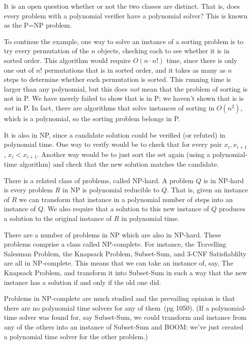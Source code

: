 \documentclass[12pt,x11names, rgb]{article}
\begin{document}
    It is an open question whether or not the two classes are distinct. That is, does every problem with a polynomial verifier have a polynomial solver? This is known as the P=NP problem.

    To continue the example, one way to solve an instance of a sorting problem is to try every permutation of the $n$ objects, checking each to see whether it is in sorted order. This algorithm would require $O(n\cdot n!)$ time, since there is only one out of $n!$ permutations that is in sorted order, and it takes as many as $n$ steps to determine whether each permutation is sorted. This running time is larger than any polynomial, but this does \emph{not} mean that the problem of sorting is not in P. We have merely failed to show that is in P; we haven't shown that is is \emph{not} in P. In fact, there are algorithms that solve instances of sorting in $O(n^2)$, which is a polynomial, so the sorting problem belongs in P. 

    It is also in NP, since a candidate solution could be verified (or refuted) in polynomial time. One way to verify would be to check that for every pair $x_i, x_{i+1}$, $x_i < x_{i+1}$. Another way would be to just sort the set again (using a polynomial-time algorithm) and check that the new solution matches the candidate. 

    There is a related class of problems, called NP-hard. A problem $Q$ is in NP-hard is every problem $R$ in NP is polynomial reducible to $Q$. That is, given an instance of $R$ we can transform that instance in a polynomial number of steps into an instance of $Q$. We also require that a solution to this new instance of $Q$ produces a solution to the original instance of $R$ in polynomial time.

    There are a number of problems in NP which are also in NP-hard. These problems comprise a class called NP-complete. For instance, the Travelling Salesman Problem, the Knapsack Problem, Subset-Sum, and 3-CNF Satisfiablilty are all in NP-complete. This means that we can take an instance of, say, The Knapsack Problem, and transform it into Subset-Sum in such a way that the new instance has a solution if and only if the old one did. %

    Problems in NP-complete are much studied and the prevailing opinion is that there are no polynomial time solvers for any of them~\cite{clrs}(pg 1050). (If a polynomial-time solver was found for, say Subset-Sum, we could transform and instance from any of the others into an instance of Subset-Sum and BOOM: we've just created a polynomial time solver for the other problem.)
\end{document}
